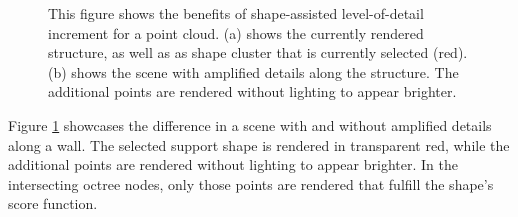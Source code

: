     \begin{figure}
        \centering
        \par\medskip
        \caption[Comparison of a scene with and without shape-assisted level-of-detail increment.]
        {This figure shows the benefits of shape-assisted level-of-detail increment for a point cloud. (a) shows the currently rendered structure, as well as as shape cluster that is currently selected (red). (b) shows the scene with amplified details along the structure. The additional points are rendered without lighting to appear brighter.}
        \label{fig:lod_increment}
    \end{figure}
    
Figure \ref{fig:lod_increment} showcases the difference in a scene with and without amplified details along a wall. The selected support shape is rendered in transparent red, while the additional points are rendered without lighting to appear brighter. In the intersecting octree nodes, only those points are rendered that fulfill the shape's score function. 
    
    
